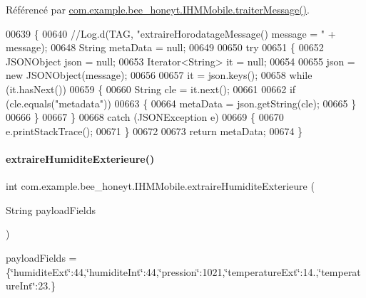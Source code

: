 Référencé par \hyperlink{_i_h_m_mobile_8java_source_l00374}{com.\+example.\+bee\+\_\+honeyt.\+I\+H\+M\+Mobile.\+traiter\+Message()}.


\begin{DoxyCode}
00639     \{
00640         \textcolor{comment}{//Log.d(TAG, "extraireHorodatageMessage() message = " + message);}
00648 \textcolor{comment}{}        String metaData = null;
00649 
00650         \textcolor{keywordflow}{try}
00651         \{
00652             JSONObject json = null;
00653             Iterator<String> it = null;
00654 
00655             json = \textcolor{keyword}{new} JSONObject(message);
00656 
00657             it = json.keys();
00658             \textcolor{keywordflow}{while} (it.hasNext())
00659             \{
00660                 String cle = it.next();
00661 
00662                 \textcolor{keywordflow}{if} (cle.equals(\textcolor{stringliteral}{"metadata"}))
00663                 \{
00664                     metaData = json.getString(cle);
00665                 \}
00666             \}
00667         \}
00668         \textcolor{keywordflow}{catch} (JSONException e)
00669         \{
00670             e.printStackTrace();
00671         \}
00672 
00673         \textcolor{keywordflow}{return} metaData;
00674     \}
\end{DoxyCode}
\mbox{\label{classcom_1_1example_1_1bee__honeyt_1_1_i_h_m_mobile_a9a8131f2198266585e602e6fe9d29ef0}} 
\paragraph{\texorpdfstring{extraire\+Humidite\+Exterieure()}{extraireHumiditeExterieure()}}
{\footnotesize\ttfamily int com.\+example.\+bee\+\_\+honeyt.\+I\+H\+M\+Mobile.\+extraire\+Humidite\+Exterieure (\begin{DoxyParamCaption}\item[{String}]{payload\+Fields }\end{DoxyParamCaption})\hspace{0.3cm}{\ttfamily [private]}}

payload\+Fields = \{\char`\"{}humidite\+Ext\char`\"{}\+:44,\char`\"{}humidite\+Int\char`\"{}\+:44,\char`\"{}pression\char`\"{}\+:1021,\char`\"{}temperature\+Ext\char`\"{}\+:14.,\char`\"{}temperature\+Int\char`\"{}\+:23.\}

